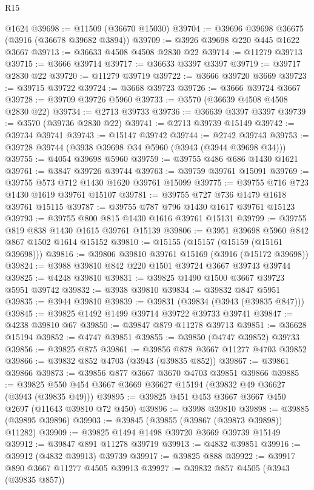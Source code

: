 \begin{lexlean}{R15}
\begin{coremodule}
    @1624
@39698 := @11509 (@36670 @15030)
@39704 := @39696 @39698 @36675 (@3916 (@36678 @39682 @3894))
@39709 := @3926 @39698 @220 @445 @1622 @3667
@39713 := @36633 @4508 @4508 @2830 @22
@39714 := @11279 @39713
@39715 := @3666 @39714
@39717 := @36633 @3397 @3397
@39719 := @39717 @2830 @22
@39720 := @11279 @39719
@39722 := @3666 @39720 @3669
@39723 := @39715 @39722
@39724 := @3668 @39723
@39726 := @3666 @39724 @3667
@39728 := @39709 @39726 @5960
@39733 := @3570 (@36639 @4508 @4508 @2830 @22)
@39734 := @2713 @39733
@39736 := @36639 @3397 @3397
@39739 := @3570 (@39736 @2830 @22)
@39741 := @2713 @39739 @15149
@39742 := @39734 @39741
@39743 := @15147 @39742
@39744 := @2742 @39743
@39753 := @39728 @39744 (@3938 @39698 @34 @5960 (@3943 (@3944 @39698 @34)))
@39755 := @4054 @39698 @5960
@39759 := @39755 @486 @686 @1430 @1621
@39761 := @3847 @39726 @39744
@39763 := @39759 @39761 @15091
@39769 := @39755 @573 @712 @1430 @1620 @39761 @15099
@39775 := @39755 @716 @723 @1430 @1619 @39761 @15107
@39781 := @39755 @727 @736 @1479 @1618 @39761 @15115
@39787 := @39755 @787 @796 @1430 @1617 @39761 @15123
@39793 := @39755 @800 @815 @1430 @1616 @39761 @15131
@39799 := @39755 @819 @838 @1430 @1615 @39761 @15139
@39806 := @3951 @39698 @5960 @842 @867 @1502 @1614 @15152
@39810 := @15155 (@15157 (@15159 (@15161 @39698)))
@39816 := @39806 @39810 @39761 @15169 (@3916 (@15172 @39698))
@39824 := @3988 @39810 @842 @220 @1501 @39724 @3667 @39743 @39744
@39825 := @4248 @39810
@39831 := @39825 @1490 @1500 @3667 @39723 @5951 @39742
@39832 := @3938 @39810
@39834 := @39832 @847 @5951
@39835 := @3944 @39810
@39839 := @39831 (@39834 (@3943 (@39835 @847)))
@39845 := @39825 @1492 @1499 @39714 @39722 @39733 @39741
@39847 := @4238 @39810 @67
@39850 := @39847 @879 @11278 @39713
@39851 := @36628 @15194
@39852 := @4747 @39851
@39855 := @39850 (@4747 @39852) @39733
@39856 := @39825 @875
@39861 := @39856 @878 @3667 @11277 @4703 @39852
@39866 := @39832 @852 @4703 (@3943 (@39835 @852))
@39867 := @39861 @39866
@39873 := @39856 @877 @3667 @3670 @4703 @39851 @39866
@39885 := @39825 @550 @454 @3667 @3669 @36627 @15194 (@39832 @49 @36627 (@3943 (@39835 @49)))
@39895 := @39825 @451 @453 @3667 @3667 @450 @2697 (@11643 @39810 @72 @450)
@39896 := @3998 @39810
@39898 := @39885 (@39895 @39896)
@39903 := @39845 (@39855 (@39867 (@39873 @39898)) @11282)
@39909 := @39825 @1494 @1498 @39720 @3669 @39739 @15149
@39912 := @39847 @891 @11278 @39719
@39913 := @4832 @39851
@39916 := @39912 (@4832 @39913) @39739
@39917 := @39825 @888
@39922 := @39917 @890 @3667 @11277 @4505 @39913
@39927 := @39832 @857 @4505 (@3943 (@39835 @857))

\end{coremodule}
\end{lexlean}
